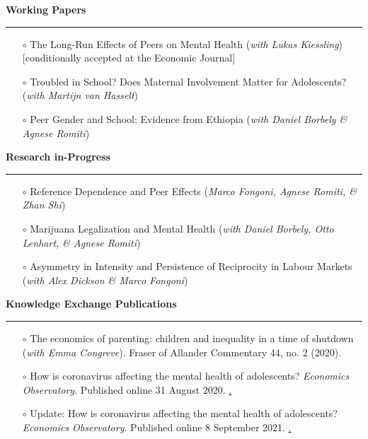 \documentclass[12pt,a4paper]{article}
\begin{document}
	\bigskip 
	
	\noindent \textbf{\textsf{{\large Working Papers}}}  \vspace{0.1cm} \hrule \vspace{0.2cm}  

		\begin{itemize}
		\item[$\circ$] The Long-Run Effects of Peers on Mental Health (\textit{with Lukas Kiessling}) [conditionally accepted at the Economic Journal]
		\item[$\circ$] Troubled in School? Does Maternal Involvement Matter for Adolescents? (\textit{with Martijn van Hasselt})
		\item[$\circ$] Peer Gender and School: Evidence from Ethiopia (\textit{with Daniel Borbely \& Agnese Romiti})
		\end{itemize}
		
	\bigskip

	\noindent \textbf{\textsf{{\large Research in-Progress}}}  \vspace{0.1cm} \hrule \vspace{0.2cm}  

		\begin{itemize}
		\item[$\circ$] Reference Dependence and Peer Effects (\textit{Marco Fongoni, Agnese Romiti, \& Zhan Shi})
		\item[$\circ$] Marijuana Legalization and Mental Health (\textit{with Daniel Borbely, Otto Lenhart, \& Agnese Romiti})
		\item[$\circ$] Asymmetry in Intensity and Persistence of Reciprocity in Labour Markets (\textit{with Alex Dickson \& Marco Fongoni}) 	
		\end{itemize}

	\newpage
	\noindent \textbf{\textsf{{\large Knowledge Exchange Publications}}}  \vspace{0.1cm} \hrule \vspace{0.2cm}	

		\begin{itemize}
		\item[$\circ$] The economics of parenting: children and inequality in a time of shutdown (\textit{with Emma Congreve}). Fraser of Allander Commentary 44, no. 2 (2020).
		\item[$\circ$] How is coronavirus affecting the mental health of adolescents? \textit{Economics Observatory}. Published online 31 August 2020. \href{https://www.economicsobservatory.com/how-coronavirus-affecting-mental-health-adolescents}. 
		\item[$\circ$] Update: How is coronavirus affecting the mental health of adolescents? \textit{Economics Observatory}. Published online 8 September 2021. \href{https://www.economicsobservatory.com/update-how-is-coronavirus-affecting-the-mental-health-of-adolescents}. 
		\end{itemize}
\end{document}
